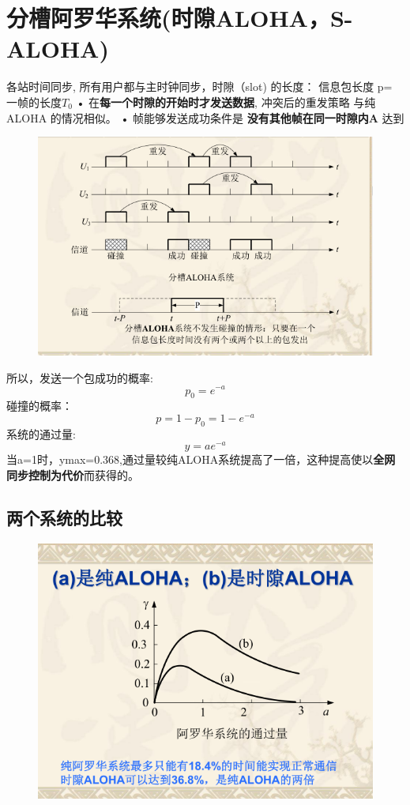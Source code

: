 \section{分槽阿罗华系统(时隙ALOHA，S-ALOHA)}
各站时间同步, 所有用户都与主时钟同步，时隙（slot) 的长度： 信息包长度 p= 一帧的长度$ T_0 $
• 在\textbf{每一个时隙的开始时才发送数据}, 冲突后的重发策略
与纯ALOHA 的情况相似。
• 帧能够发送成功条件是 \textbf{没有其他帧在同一时隙内A} 达到
\begin{figure}[htbp]
	\centering
	\includegraphics[width=0.7\linewidth]{figures/screenshot005}
	\caption{}
	\label{fig:screenshot005}
\end{figure}
所以，发送一个包成功的概率:
\begin{equation}\label{key}
p_0 = e^{-a}
\end{equation}
碰撞的概率：
\begin{equation}\label{key}
p = 1-p_0 = 1-e^{-a}
\end{equation}
系统的通过量:
\begin{equation}\label{key}
y = ae^{-a}
\end{equation}
当a=1时，ymax=0.368,通过量较纯ALOHA系统提高了一倍，这种提高使以\textbf{全网同步控制为代价}而获得的。
\subsection{两个系统的比较}
\begin{figure}[H]
	\centering
	\includegraphics[width=0.7\linewidth]{figures/screenshot006}
	\caption{}
	\label{fig:screenshot006}
\end{figure}
